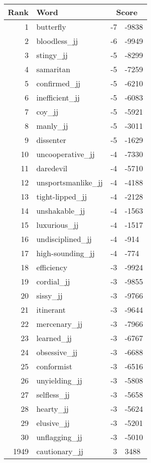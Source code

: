\begin{longtable}[!htbp]{| rlr@{.}l |}
    \hline
    \textbf{Rank} & \textbf{Word} & \multicolumn{2}{c|}{\textbf{Score}} \\
    \hline
    \endhead
    1 & butterfly & -7 & -9838 \\
    2 & bloodless\_jj & -6 & -9949 \\
    3 & stingy\_jj & -5 & -8299 \\
    4 & samaritan & -5 & -7259 \\
    5 & confirmed\_jj & -5 & -6210 \\
    6 & inefficient\_jj & -5 & -6083 \\
    7 & coy\_jj & -5 & -5921 \\
    8 & manly\_jj & -5 & -3011 \\
    9 & dissenter & -5 & -1629 \\
    10 & uncooperative\_jj & -4 & -7330 \\
    11 & daredevil & -4 & -5710 \\
    12 & unsportsmanlike\_jj & -4 & -4188 \\
    13 & tight-lipped\_jj & -4 & -2128 \\
    14 & unshakable\_jj & -4 & -1563 \\
    15 & luxurious\_jj & -4 & -1517 \\
    16 & undisciplined\_jj & -4 & -914 \\
    17 & high-sounding\_jj & -4 & -774 \\
    18 & efficiency & -3 & -9924 \\
    19 & cordial\_jj & -3 & -9855 \\
    20 & sissy\_jj & -3 & -9766 \\
    21 & itinerant & -3 & -9644 \\
    22 & mercenary\_jj & -3 & -7966 \\
    23 & learned\_jj & -3 & -6767 \\
    24 & obsessive\_jj & -3 & -6688 \\
    25 & conformist & -3 & -6516 \\
    26 & unyielding\_jj & -3 & -5808 \\
    27 & selfless\_jj & -3 & -5658 \\
    28 & hearty\_jj & -3 & -5624 \\
    29 & elusive\_jj & -3 & -5201 \\
    30 & unflagging\_jj & -3 & -5010 \\
    1949 & cautionary\_jj & 3 & 3488 \\

\end{longtable}
